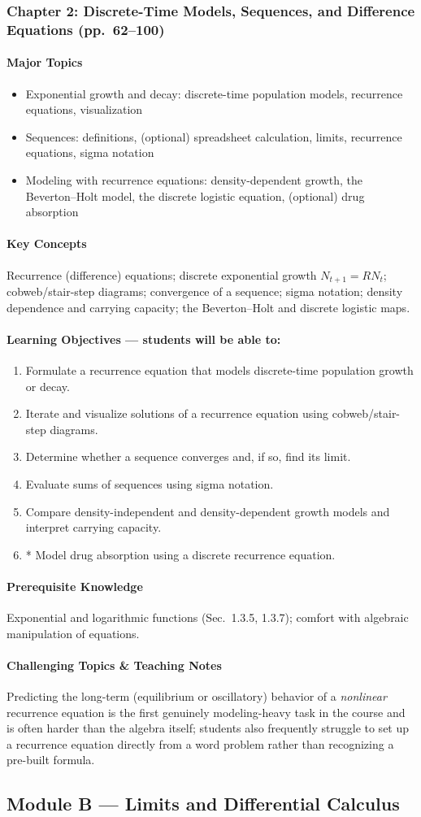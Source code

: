 \documentclass[11pt]{article}
\newcommand{\ChapHead}[2]{\subsubsection{#1 \textnormal{\normalfont\normalsize\color{lightgray}(pp.\ #2)}}}
\newcommand{\MajorTopics}{\paragraph{Major Topics}}
\newcommand{\KeyConcepts}{\paragraph{Key Concepts}}
\newcommand{\LearnObj}{\paragraph{Learning Objectives --- students will be able to:}}
\newcommand{\PreReq}{\paragraph{Prerequisite Knowledge}}
\newcommand{\Hard}{\paragraph{Challenging Topics \& Teaching Notes}}
\begin{document}
\bigskip
\ChapHead{Chapter 2: Discrete-Time Models, Sequences, and Difference Equations}{62--100}

\MajorTopics
\begin{itemize}
\item Exponential growth and decay: discrete-time population models, recurrence equations, visualization
\item Sequences: definitions, (optional) spreadsheet calculation, limits, recurrence equations, sigma notation
\item Modeling with recurrence equations: density-dependent growth, the Beverton--Holt model, the discrete logistic equation, (optional) drug absorption
\end{itemize}

\KeyConcepts
Recurrence (difference) equations; discrete exponential growth
$N_{t+1}=RN_t$; cobweb/stair-step diagrams; convergence of a sequence;
sigma notation; density dependence and carrying capacity; the
Beverton--Holt and discrete logistic maps.

\LearnObj
\begin{enumerate}
\item Formulate a recurrence equation that models discrete-time population growth or decay.
\item Iterate and visualize solutions of a recurrence equation using cobweb/stair-step diagrams.
\item Determine whether a sequence converges and, if so, find its limit.
\item Evaluate sums of sequences using sigma notation.
\item Compare density-independent and density-dependent growth models and interpret carrying capacity.
\item * Model drug absorption using a discrete recurrence equation.
\end{enumerate}

\PreReq Exponential and logarithmic functions (Sec.\ 1.3.5, 1.3.7); comfort with algebraic manipulation of equations.

\Hard Predicting the long-term (equilibrium or oscillatory) behavior of a
\emph{nonlinear} recurrence equation is the first genuinely modeling-heavy
task in the course and is often harder than the algebra itself; students
also frequently struggle to set up a recurrence equation directly from a
word problem rather than recognizing a pre-built formula.

\subsection{Module B --- Limits and Differential Calculus}
\end{document}
